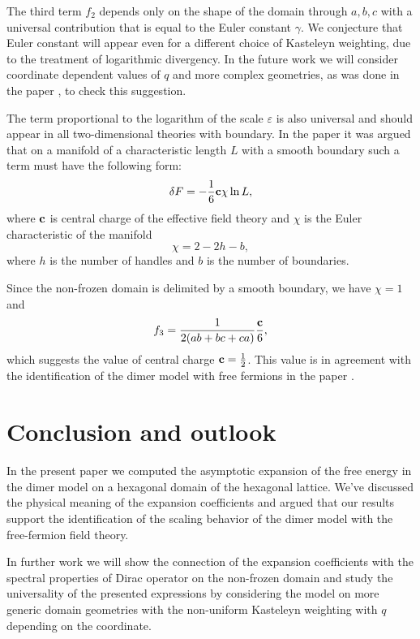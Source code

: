 \documentclass{article}
\begin{document}
The third term $f_{2}$ depends only on the shape of the domain through $a,b,c$ with a universal
contribution that is equal to the Euler constant $\gamma$. We conjecture that Euler constant will
appear even for a different choice of Kasteleyn weighting, due to the treatment of logarithmic
divergency. In the future work we will consider coordinate dependent values of $q$ and more complex
geometries, as was done in the paper \cite{okounkov2007random}, to check this suggestion. 

The term proportional to the logarithm of the scale $\varepsilon$ is also universal
\cite{cardy1988finite} and should appear in all two-dimensional theories with boundary. In the paper
\cite{cardy1988finite} it was argued that on a manifold of a characteristic length $L$ with a smooth
boundary such a term must have the following form:
\begin{equation}
  \label{eq:31}
  \delta F = -\frac{1}{6}{\bf c} \chi \ln L,
\end{equation}
where ${\bf c}$ is central charge of the effective field theory and $\chi$ is the Euler characteristic of
the manifold
\begin{equation}
  \label{eq:32}
  \chi=2-2 h-b,
\end{equation}
where $h$ is the number of handles and $b$ is the number of boundaries. 

Since the non-frozen domain is delimited by a smooth boundary, we have $\chi=1$ and
\begin{equation}
  \label{eq:33}
  f_{3}=\frac{1}{2(ab+bc+ca)} \frac{{\bf c}}{6},
\end{equation}
which suggests the value of central charge ${\bf c}=\frac{1}{2}$. This value is in agreement with the
identification of the dimer model with free fermions in the paper \cite{dijkgraaf2009dimer}. 


\section*{Conclusion and outlook}
\label{sec:conclusion}

In the present paper we computed the asymptotic expansion of the free energy in the dimer model on a
hexagonal domain of the hexagonal lattice. We've discussed the physical meaning of the expansion
coefficients and argued that our results support the identification of the scaling behavior of the
dimer model with the free-fermion field theory.

In further work we will show the connection of the expansion coefficients with the spectral
properties of Dirac operator on the non-frozen domain and study the universality of the presented
expressions by considering the model on more generic domain geometries with the non-uniform
Kasteleyn weighting with $q$ depending on the coordinate.
\end{document}
